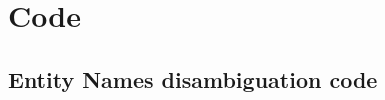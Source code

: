 \chapter{Code}\label{chap_code}



\newpage
\section{Entity Names disambiguation code}
 


\newpage

